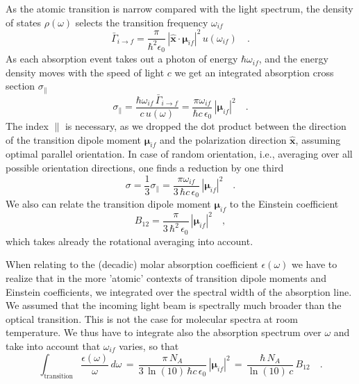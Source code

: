 As the atomic transition is narrow compared with the light spectrum, the density of states $\rho(\omega)$ selects the transition frequency $\omega_{if}$ 
\[
 \bar{\Gamma}_{i \rightarrow f} =   \frac{\pi  }{\hbar^2 \epsilon_0}  \, |\mathbf{\hat{x}} \cdot \mathbf{\mu}_{if} |^2 \,
 u(\omega_{if})   \quad .
\]
As each absorption event takes out a photon of energy $\hbar \omega_{if}$, and the energy density moves with the speed of light $c$ we get an integrated absorption cross section $\sigma_{\parallel} $
\[
 \sigma_{\parallel} = \frac{ \hbar \omega_{if} \, \bar{\Gamma}_{i \rightarrow f} }{c \, u(\omega)}  = 
  \frac{\pi \omega_{if}}{ \hbar c \, \epsilon_0} \,
 |\mathbf{\mu}_{if} |^2  \quad .
\]
The index ${\parallel} $ is necessary, as we dropped the dot product between the direction of the transition dipole moment $\mathbf{\mu}_{if}$ and the polarization direction $\mathbf{\hat{x}}$, assuming optimal parallel orientation. In case of random orientation, i.e., averaging over all possible orientation directions, one finds  a reduction by one third
\[
 \sigma = \frac{1}{3} \sigma_{\parallel} = 
  \frac{\pi \omega_{if}}{ 3 \, \hbar c \, \epsilon_0} \,
 |\mathbf{\mu}_{if} |^2  \quad .
\]
We also can relate the transition dipole moment $\mathbf{\mu}_{if} $ to the Einstein coefficient
\[
B_{12} = \frac{\pi}{3 \, \hbar^2 \, \epsilon_0} \,  |\mathbf{\mu}_{if} |^2  \quad ,
\]
which takes already the rotational averaging into account.


When relating to the  (decadic) molar absorption coefficient $\epsilon(\omega)$ we have to realize that in the more 'atomic' contexts of transition dipole moments and Einstein coefficients, we integrated over the spectral width of the absorption line. We  assumed that the incoming light beam is spectrally much broader than the optical transition. This is not the case for molecular spectra at room temperature. We thus have to integrate also the absorption spectrum over $\omega$ and take into account that $\omega_{if}$ varies, so that
\[
 \int_{\text{transition}} \frac{\epsilon(\omega)}{\omega} \, d \omega \, = \, 
  \frac{\pi \, N_A}{ 3 \, \ln(10) \, \hbar c \, \epsilon_0} \,
 |\mathbf{\mu}_{if} |^2
 \, = \, 
  \frac{\hbar\, N_A}{ \ln(10) \, c } \,
B_{12}  \quad .
\]

\printbibliography[segment=\therefsegment,heading=subbibliography]
